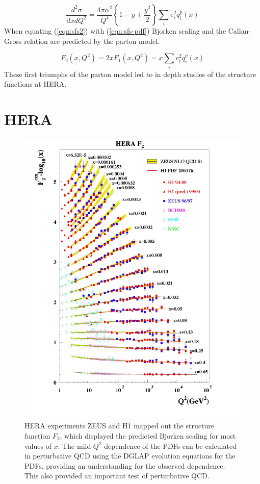 \begin{equation}
	\label{eqn:sfs-pdf}
	\frac{d^2\sigma}{dx dQ^2} = \frac{4 \pi \alpha^2}{Q^4} \left\lbrace 1 - y + \frac{y^2}{2} \right\rbrace \sum_{i} e_i^2 q_i^p (x)
\end{equation}
When equating (\ref{eqn:sfs2}) with (\ref{eqn:sfs-pdf}) Bjorken scaling and the Callan-Gross relation are predicted by the parton model.

\begin{equation}
	\label{eqn:bjorken-scaling}
	F_{2} (x, Q^2) = 2xF_1 (x, Q^2) = x \sum_{i} e_i^2 q_i^p(x)
\end{equation}
These first triumphs of the parton model led to in depth studies of the structure functions at HERA.

\section{HERA}

\begin{figure}
	\centering
	\includegraphics[width = \textwidth]{image/plots/introduction/f2.jpg}	
	\caption[$F_{2} (Q^2)$ results from HERA]{HERA experiments ZEUS and H1 mapped out the structure function $F_2$, which displayed the predicted Bjorken scaling for most values of $x$.   The mild $Q^2$ dependence of the PDFs can be calculated in perturbative QCD using the DGLAP evolution equations for the PDFs, providing an understanding for the observed dependence.  This also provided an important test of perturbative QCD.}
	\label{fig:f2}
\end{figure}

